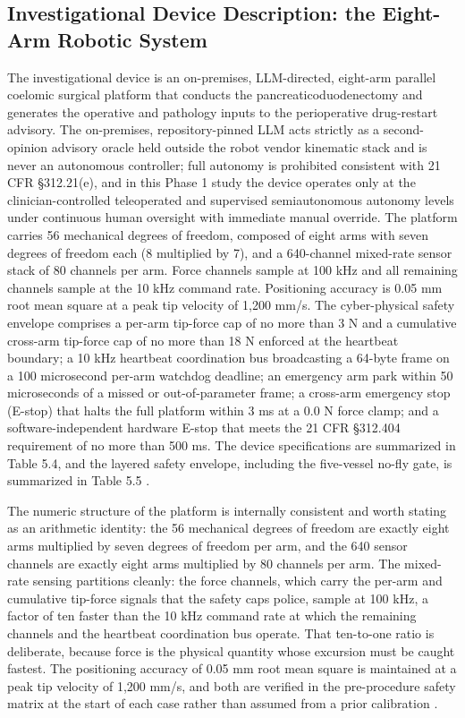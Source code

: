 \subsection*{Investigational Device Description: the Eight-Arm Robotic System}

The investigational device is an on-premises, LLM-directed, eight-arm parallel
coelomic surgical platform that conducts the pancreaticoduodenectomy and generates
the operative and pathology inputs to the perioperative drug-restart advisory. The
on-premises, repository-pinned LLM acts strictly as a second-opinion advisory
oracle held outside the robot vendor kinematic stack and is never an autonomous
controller; full autonomy is prohibited consistent with 21 CFR \S 312.21(e), and
in this Phase 1 study the device operates only at the clinician-controlled
teleoperated and supervised semiautonomous autonomy levels under continuous human
oversight with immediate manual override. The platform carries 56 mechanical
degrees of freedom, composed of eight arms with seven degrees of freedom each
(8 multiplied by 7), and a 640-channel mixed-rate sensor stack of 80 channels per
arm. Force channels sample at 100 kHz and all remaining channels sample at the
10 kHz command rate. Positioning accuracy is 0.05 mm root mean square at a peak tip
velocity of 1,200 mm/s. The cyber-physical safety envelope comprises a per-arm
tip-force cap of no more than 3 N and a cumulative cross-arm tip-force cap of no
more than 18 N enforced at the heartbeat boundary; a 10 kHz heartbeat coordination
bus broadcasting a 64-byte frame on a 100 microsecond per-arm watchdog deadline; an
emergency arm park within 50 microseconds of a missed or out-of-parameter frame; a
cross-arm emergency stop (E-stop) that halts the full platform within 3 ms at a
0.0 N force clamp; and a software-independent hardware E-stop that meets the 21 CFR
\S 312.404 requirement of no more than 500 ms. The device specifications are
summarized in Table 5.4, and the layered safety envelope, including the five-vessel
no-fly gate, is summarized in Table 5.5 \cite{daraxwhipple,onpremwhippl}.

The numeric structure of the platform is internally consistent and worth stating as
an arithmetic identity: the 56 mechanical degrees of freedom are exactly eight arms
multiplied by seven degrees of freedom per arm, and the 640 sensor channels are
exactly eight arms multiplied by 80 channels per arm. The mixed-rate sensing
partitions cleanly: the force channels, which carry the per-arm and cumulative
tip-force signals that the safety caps police, sample at 100 kHz, a factor of ten
faster than the 10 kHz command rate at which the remaining channels and the
heartbeat coordination bus operate. That ten-to-one ratio is deliberate, because
force is the physical quantity whose excursion must be caught fastest. The
positioning accuracy of 0.05 mm root mean square is maintained at a peak tip velocity
of 1,200 mm/s, and both are verified in the pre-procedure safety matrix at the start
of each case rather than assumed from a prior calibration \cite{daraxwhipple,onpremwhippl}.

